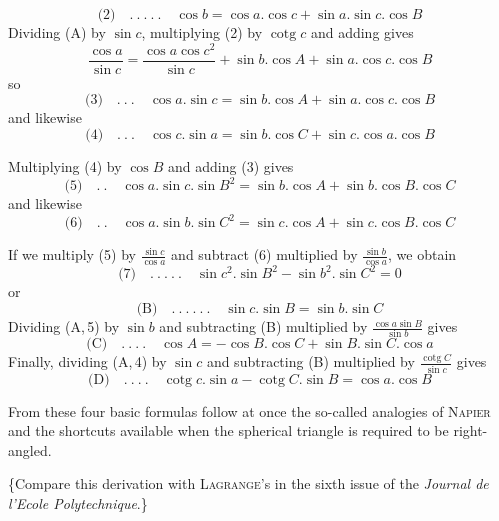 %
\[
\text{(2)}\quad .\ .\ .\ .\ .\quad\cos b=\cos a.\cos c+\sin a.\sin c.\cos B
\]
Dividing (A) by \(\sin c\), multiplying (2) by \(\operatorname{cotg}c\) and adding gives
\[
\frac{\cos a}{\sin c}=\frac{\cos a\cos c^2}{\sin c}+\sin b.\cos A+\sin a.\cos c.\cos B
\]
so
\[
\text{(3)}\quad .\ .\ .\quad\cos a.\sin c=\sin b.\cos A+\sin a.\cos c.\cos B
\]
and likewise
\[
\text{(4)}\quad .\ .\ .\quad\cos c.\sin a=\sin b.\cos C+\sin c.\cos a.\cos B
\]
\par
Multiplying (4) by \(\cos B\) and adding (3) gives
\[
\text{(5)}\quad .\ .\quad\cos a.\sin c.\sin B^2=\sin b.\cos A+\sin b.\cos B.\cos C
\]
and likewise
\[
\text{(6)}\quad .\ .\quad\cos a.\sin b.\sin C^2=\sin c.\cos A+\sin c.\cos B.\cos C
\]
\par
If we multiply (5) by \(\frac{\sin c}{\cos a}\) and subtract (6) multiplied by \(\frac{\sin b}{\cos a}\), we obtain
\[
\text{(7)}\quad .\ .\ .\ .\ .\quad\sin c^2.\sin B^2-\sin b^2.\sin C^2=0
\]
or
\[
\text{(B)}\quad .\ .\ .\ .\ .\ .\quad\sin c.\sin B=\sin b.\sin C
\]
Dividing (A,\,5) by \(\sin b\) and subtracting (B) multiplied by \(\frac{\cos a\sin B}{\sin b}\) gives
\[
\text{(C)}\quad .\ .\ .\ .\quad\cos A=-\cos B.\cos C+\sin B.\sin C.\cos a
\]
Finally, dividing (A,\,4) by \(\sin c\) and subtracting (B) multiplied by \(\frac{\operatorname{cotg}C}{\sin c}\) gives
\[
\text{(D)}\quad .\ .\ .\ .\quad\operatorname{cotg}c.\sin a-\operatorname{cotg}C.\sin B=\cos a.\cos B
\]
\par
From these four basic formulas follow at once the so-called analogies of \textsc{Napier} and the shortcuts available when the spherical triangle is required to be right-angled.

\{Compare this derivation with \textsc{Lagrange}'s in the sixth issue of the \textit{Journal de l’Ecole Polytechnique}.\}
